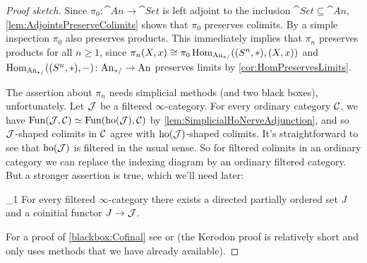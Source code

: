 \begin{proof}[Proof sketch]
	Since $\pi_0\colon\cat{An}\rightarrow\cat{Set}$ is left adjoint to the inclusion $\cat{Set}\subseteq \cat{An}$, \cref{lem:AdjointsPreserveColimits} shows that $\pi_0$ preserves colimits. By a simple inspection $\pi_0$ also preserves products. This immediately implies that $\pi_n$ preserves products for all $n\geqslant 1$, since $\pi_n(X,x)\cong \pi_0\operatorname{Hom}_{\mathrm{An}_{*/}}((S^n,*),(X,x))$ and $\operatorname{Hom}_{\mathrm{An}_{*/}}((S^n,*),-)\colon \mathrm{An}_{*/}\rightarrow \mathrm{An}$ preserves limits by \cref{cor:HomPreservesLimits}.
	
	The assertion about $\pi_n$ needs simplicial methods (and two black boxes), unfortunately. Let $\mathcal{J}$ be a filtered $\infty$-category. For every ordinary category $\mathcal{C}$, we have $\operatorname{Fun}(\mathcal{J},\mathcal{C})\simeq \operatorname{Fun}(\operatorname{ho}(\mathcal{J}),\mathcal{C})$ by \cref{lem:SimplicialHoNerveAdjunction}, and so $\mathcal{J}$-shaped colimits in $\mathcal{C}$ agree with $\operatorname{ho}(\mathcal{J})$-shaped colimits. It's straightforward to see that $\operatorname{ho}(\mathcal{J})$ is filtered in the usual sense. So for filtered colimits in an ordinary category we can replace the indexing diagram by an ordinary filtered category. But a stronger assertion is true, which we'll need later:
	\begin{alphanumerate}\itshape
		\item[\blacksquare_1] For every filtered $\infty$-category there exists a directed partially ordered set $J$ and a coinitial functor $J\rightarrow \mathcal{J}$.\label{blackbox:Cofinal}
	\end{alphanumerate}
	For a proof of \cref{blackbox:Cofinal} see \cite[Proposition~]{HTT} or \cite[Tag~\href{https://kerodon.net/tag/02QA}{02QA}]{Kerodon} (the Kerodon proof is relatively short and only uses methods that we have already available).
	

\end{proof}
